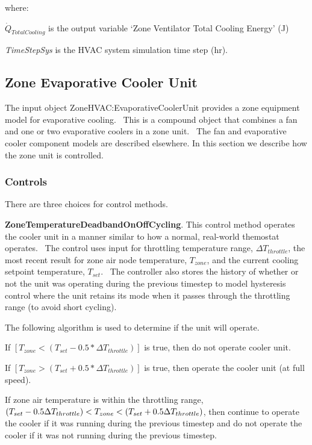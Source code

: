 where:

\(\dot{Q}_{TotalCooling}\) is the output variable `Zone Ventilator Total Cooling Energy' (J)

\emph{TimeStepSys} is the HVAC system simulation time step (hr).

\subsection{Zone Evaporative Cooler Unit}\label{zone-evaporative-cooler-unit}

The input object ZoneHVAC:EvaporativeCoolerUnit provides a zone equipment model for evaporative cooling.~ This is a compound object that combines a fan and one or two evaporative coolers in a zone unit.~ The fan and evaporative cooler component models are described elsewhere. In this section we describe how the zone unit is controlled.

\subsubsection{Controls}\label{controls-000}

There are three choices for control methods.

\textbf{ZoneTemperatureDeadbandOnOffCycling}. This control method operates the cooler unit in a manner similar to how a normal, real-world themostat operates.~ The control uses input for throttling temperature range, \(\Delta {T_{throttle}}\), the most recent result for zone air node temperature, \({T_{zone}}\), and the current cooling setpoint temperature, \({T_{set}}\).~ The controller also stores the history of whether or not the unit was operating during the previous timestep to model hysteresis control where the unit retains its mode when it passes through the throttling range (to avoid short cycling).

The following algorithm is used to determine if the unit will operate.

If \(\left[ {{T_{zone}} < \left( {{T_{set}} - 0.5*\Delta {T_{throttle}}} \right)} \right]\) is true, then do not operate cooler unit.

If \(\left[ {{T_{zone}} > \left( {{T_{set}} + 0.5*\Delta {T_{throttle}}} \right)} \right]\) is true, then operate the cooler unit (at full speed).

If zone air temperature is within the throttling range, $\PB{T_{set}-0.5\Delta T_{throttle}} < T_{zone} < \PB{T_{set}+0.5\Delta T_{throttle}}$, then continue to operate the cooler if it was running during the previous timestep and do not operate the cooler if it was not running during the previous timestep.

